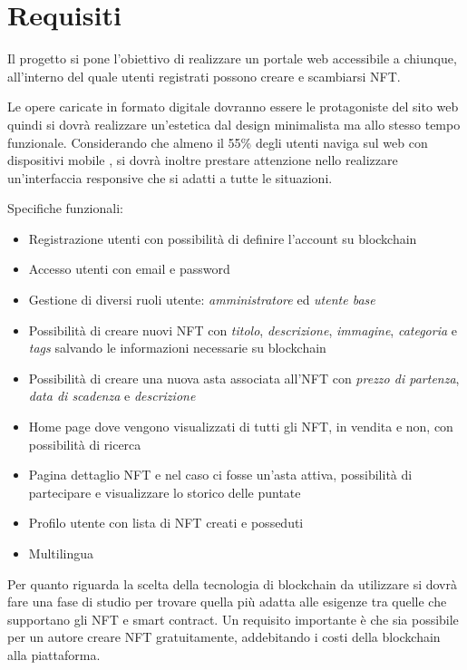 \section{Requisiti}
Il progetto si pone l'obiettivo di realizzare un portale web accessibile a chiunque, 
all'interno del quale utenti registrati possono creare e scambiarsi NFT.

Le opere caricate in formato digitale dovranno essere le protagoniste del sito web
quindi si dovrà realizzare un'estetica dal design minimalista ma allo stesso tempo funzionale.
Considerando che almeno il 55\% degli utenti naviga sul web con dispositivi mobile \cite{require1}, 
si dovrà inoltre prestare attenzione nello realizzare un'interfaccia responsive che si adatti a tutte le situazioni. 

Specifiche funzionali:
\begin{itemize}
	\item Registrazione utenti con possibilità di definire l'account su blockchain
	\item Accesso utenti con email e password
	\item Gestione di diversi ruoli utente: \textit{amministratore} ed \textit{utente base}
	\item Possibilità di creare nuovi NFT con \textit{titolo}, \textit{descrizione}, \textit{immagine}, \textit{categoria} e \textit{tags} salvando le informazioni necessarie su blockchain
	\item Possibilità di creare una nuova asta associata all'NFT con \textit{prezzo di partenza}, \textit{data di scadenza} e \textit{descrizione}
	\item Home page dove vengono visualizzati di tutti gli NFT, in vendita e non, con possibilità di ricerca
	\item Pagina dettaglio NFT e nel caso ci fosse un'asta attiva, possibilità di partecipare e visualizzare lo storico delle puntate 
	\item Profilo utente con lista di NFT creati e posseduti
	\item Multilingua
\end{itemize}

Per quanto riguarda la scelta della tecnologia di blockchain da utilizzare 
si dovrà fare una fase di studio per trovare quella più adatta alle esigenze 
tra quelle che supportano gli NFT e smart contract. 
Un requisito importante è che sia possibile per un autore creare NFT gratuitamente, 
addebitando i costi della blockchain alla piattaforma. 
